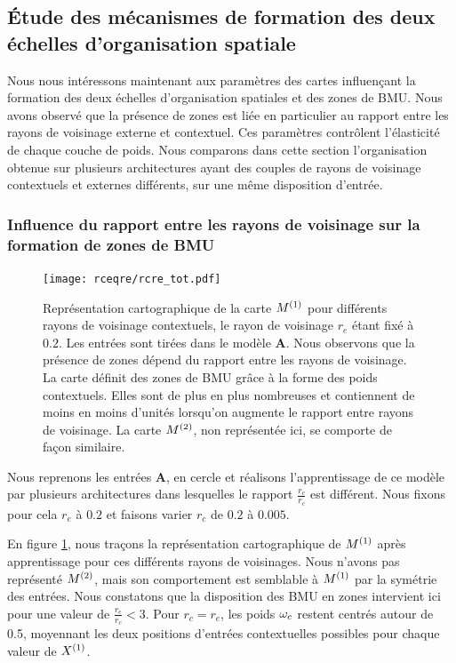 \documentclass[../main]{subfiles}
\begin{document}
\subsection{\'Etude des mécanismes de formation des deux échelles d'organisation spatiale}

Nous nous intéressons maintenant aux paramètres des cartes influençant la formation des deux échelles d'organisation spatiales et des zones de BMU.
Nous avons observé que la présence de zones est liée en particulier au rapport entre les rayons de voisinage externe et contextuel.
Ces paramètres contrôlent l'élasticité de chaque couche de poids.
Nous comparons dans cette section l'organisation obtenue sur plusieurs architectures ayant des couples de rayons de voisinage contextuels et externes différents, sur une même disposition d'entrée.

\subsubsection{Influence du rapport entre les rayons de voisinage sur la formation de zones de BMU}
\begin{figure}[t]
	\texttt{[image: rceqre/rcre\_tot.pdf]}
	\caption{Représentation cartographique de la carte $M^{({1})}$ pour différents rayons de voisinage contextuels, le rayon de voisinage $r_e$ étant fixé à $0.2$. Les entrées sont tirées dans le modèle \textbf{A}.
	Nous observons que la présence de zones dépend du rapport entre les rayons de voisinage. La carte définit des zones de BMU grâce à la forme des poids contextuels. Elles sont de plus en plus nombreuses et contiennent de moins en moins d'unités lorsqu'on augmente le rapport entre rayons de voisinage.
	La carte $M^{({2})}$, non représentée ici, se comporte de façon similaire.\label{fig:rcre}
	}
\end{figure}

Nous reprenons les entrées \textbf{A}, en cercle et réalisons l'apprentissage de ce modèle par plusieurs architectures dans lesquelles le rapport $\frac{r_e}{r_c}$ est différent.
Nous fixons  pour cela $r_e$ à $0.2$ et faisons varier $r_c$ de $0.2$ à $0.005$.

En figure \ref{fig:rcre}, nous traçons la représentation cartographique de $M^{({1})}$ après apprentissage pour ces différents rayons de voisinages. 
Nous n'avons pas représenté $M^{({2})}$, mais son comportement est semblable à $M^{({1})}$ par la symétrie des entrées.
Nous constatons que la disposition des BMU en zones intervient ici pour une valeur de $\frac{r_e}{r_c} < 3$. Pour $r_c = r_e$, les poids $\omega_c$ restent centrés autour de 0.5, moyennant les deux positions d'entrées contextuelles possibles pour chaque valeur de $X^{({1})}$.
\end{document}
